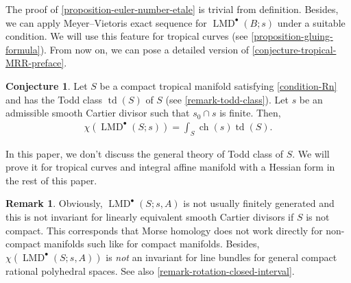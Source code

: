\documentclass[a4paper,dvipdfmx,reqno,12pt]{amsart}
\theoremstyle{definition}
\newtheorem{conjecture}[theorem]{Conjecture}
\newtheorem{remark}[theorem]{Remark}
\newcommand{\opn}[1]{\operatorname{#1}}
\numberwithin{equation}{section}
\begin{document}
The proof of \cref{proposition-euler-number-etale} is trivial from definition.
Besides, we can apply Meyer--Vietoris exact sequence 
for $\opn{LMD}^{\bullet}(B;s)$ under a suitable condition.
We will use this feature for tropical curves (see
\cref{proposition-gluing-formula}).
From now on, we can pose a detailed version of 
\cref{conjecture-tropical-MRR-preface}.
\begin{conjecture} 
\label{conjecture-tropical-MRR}
Let $S$ be a compact tropical manifold satisfying 
\cref{condition-Rn} and has the Todd class $\opn{td}(S)$ 
of $S$ (see \cref{remark-todd-class}).
Let $s$ be an admissible smooth Cartier divisor such that
$s_0\cap s$ is finite. Then, 
\begin{align}
\chi(\opn{LMD}^{\bullet}(S;s))=\int_{S}\opn{ch}(s)\opn{td}(S).
\end{align}
\end{conjecture}
In this paper, we don't discuss the general theory of 
Todd class of $S$.
We will prove it for tropical curves and integral 
affine manifold with a Hessian form in the 
rest of this paper.

\begin{remark}
Obviously, $\opn{LMD}^{\bullet}(S;s,A)$ is not usually 
finitely generated and this is not invariant 
for linearly equivalent smooth Cartier divisors
if $S$ is not compact.
This corresponds that Morse homology does not work directly
for non-compact manifolds such 
like for compact manifolds.
Besides, $\chi(\opn{LMD}^{\bullet}(S;s,A))$ is \emph{not}
an invariant for line bundles for general compact rational 
polyhedral spaces. See also 
\cref{remark-rotation-closed-interval}.  
\end{remark}
\end{document}
